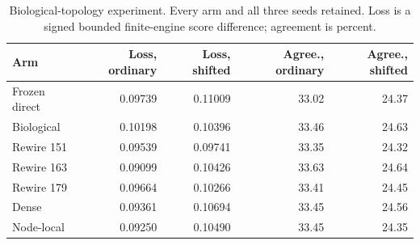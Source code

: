 \begin{table}[t]
\centering\small
\caption{Biological-topology experiment. Every arm and all three seeds retained. Loss is a signed bounded finite-engine score difference; agreement is percent.}
\begin{tabular}{lrrrr}
\toprule
Arm & Loss, ordinary & Loss, shifted & Agree., ordinary & Agree., shifted \\
\midrule
Frozen direct & 0.09739 & 0.11009 & 33.02 & 24.37 \\
Biological & 0.10198 & 0.10396 & 33.46 & 24.63 \\
Rewire 151 & 0.09539 & 0.09741 & 33.35 & 24.32 \\
Rewire 163 & 0.09099 & 0.10426 & 33.63 & 24.64 \\
Rewire 179 & 0.09664 & 0.10266 & 33.41 & 24.45 \\
Dense & 0.09361 & 0.10694 & 33.45 & 24.56 \\
Node-local & 0.09250 & 0.10490 & 33.45 & 24.35 \\
\bottomrule
\end{tabular}
\end{table}
